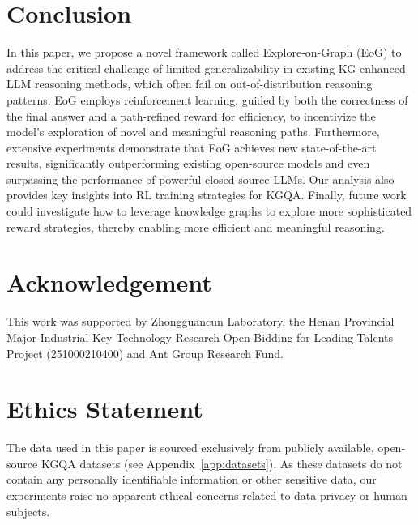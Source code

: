 \section{Conclusion}
In this paper, we propose a novel framework called
Explore-on-Graph (EoG) to address the critical challenge of limited generalizability in existing KG-enhanced LLM reasoning methods, which often fail on out-of-distribution reasoning patterns.
EoG employs reinforcement learning, guided by both the correctness of the final answer and a path-refined reward for efficiency, to incentivize the model's exploration of novel and meaningful reasoning paths.
Furthermore, extensive experiments demonstrate that EoG achieves new state-of-the-art results, significantly outperforming existing open-source models and even surpassing the performance of powerful closed-source LLMs. Our analysis also provides key insights into RL training strategies for KGQA. 
Finally, future work could investigate how to leverage knowledge graphs to explore more sophisticated reward strategies, thereby enabling more efficient and meaningful reasoning.



\section*{Acknowledgement}

This work was supported by Zhongguancun Laboratory, the Henan Provincial Major Industrial Key Technology Research Open Bidding for Leading Talents Project (251000210400) and Ant Group Research Fund.

\section*{Ethics Statement}

The data used in this paper is sourced exclusively from publicly available, open-source KGQA datasets (see Appendix~\ref{app:datasets}). As these datasets do not contain any personally identifiable information or other sensitive data, our experiments raise no apparent ethical concerns related to data privacy or human subjects.